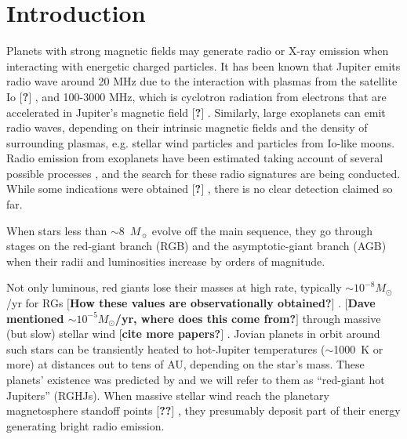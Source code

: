 \documentclass{emulateapj}
\def\memo#1{\color{red}$[${\bf #1}$]$ \color{black}}
\begin{document}
\section{Introduction}
\label{sec:intro}

Planets with strong magnetic fields may generate radio or X-ray emission when interacting with energetic charged particles. 
It has been known that Jupiter emits radio wave around 20 MHz due to the interaction with plasmas from the satellite Io \memo{?}, and 100-3000 MHz, which is cyclotron radiation from electrons that are accelerated in Jupiter's magnetic field \memo{?}. 
Similarly, large exoplanets can emit radio waves, depending on their intrinsic magnetic fields and the density of surrounding plasmas, e.g. stellar wind particles and particles from Io-like moons. 
Radio emission from exoplanets have been estimated taking account of several possible processes \citep{griebmeier2007}, and the search for these radio signatures are being conducted. 
While some indications were obtained \memo{?} \citep{lecavelier_et_al2013},  there is no clear detection claimed so far. 


When stars less than $\sim$8~$M_\sun$ evolve off the main sequence,
they go through stages on the red-giant branch (RGB) and the
asymptotic-giant branch (AGB) when their radii and luminosities
increase by orders of magnitude. 



Not only luminous, red giants lose their masses at high rate, typically $\sim  10^{-8} M_{\odot }$/yr \citep{judge1991} for RGs \memo{How these values are observationally obtained?}. \memo{Dave mentioned $\sim  10^{-5} M_{\odot }$/yr, where does this come from?} through massive (but slow) stellar wind \citep{suzuki2008} \memo{cite more papers?}. 
Jovian planets in orbit around such
stars can be transiently heated to hot-Jupiter temperatures
($\sim$1000~K or more) at distances out to tens of AU, depending on
the star's mass. These planets' existence was predicted by
\citet{spiegel+madhusudhan2012} and we will refer to them as
``red-giant hot Jupiters'' (RGHJs). 
When massive stellar wind reach the planetary magnetosphere standoff points  \memo{??}, they presumably deposit part of their energy generating bright radio emission. 
\end{document}
